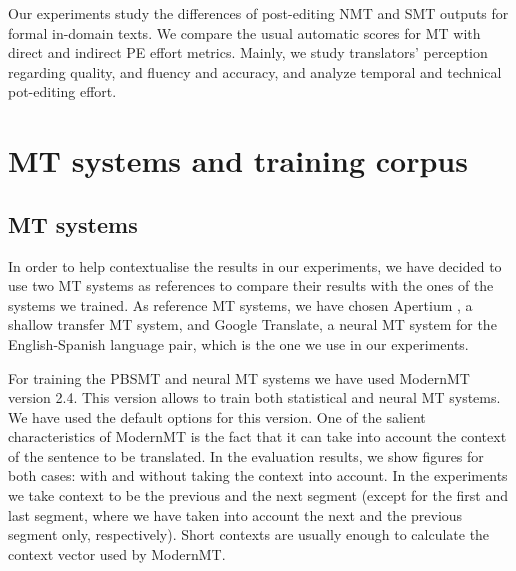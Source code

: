 \documentclass[output=paper]{langsci/langscibook}
\begin{document}

Our experiments study the differences of post-editing NMT and SMT outputs for formal in-domain texts. We compare the usual automatic scores for MT with direct and indirect PE effort metrics. Mainly, we study translators' perception regarding quality, and fluency and accuracy, and analyze temporal and technical pot-editing effort.

\section{MT systems and training corpus} \label{MTsystemsandtrainingcorpus}
\subsection{MT systems} \label{MTsystems}

In order to help contextualise the results in our experiments, we have decided to use two MT systems as references to compare their results with the ones of the systems we trained. As reference MT systems, we have chosen Apertium \citep{forcada2011apertium}, a shallow transfer MT system, and Google Translate, a neural MT system for the English-Spanish language pair, which is the one we use in our experiments.

For training the PBSMT and neural MT systems we have used ModernMT \citep{germann2016modern} version 2.4. This version allows to train both statistical and neural MT systems. We have used the default options for this version. One of the salient characteristics of ModernMT is the fact that it can take into account the context of the sentence to be translated. In the evaluation results, we show figures for both cases: with and without taking the context into account. In the experiments we take context to be the previous and the next segment (except for the first and last segment, where we have taken into account the next and the previous segment only, respectively). Short contexts are usually enough to calculate the context vector used by ModernMT.
\end{document}
